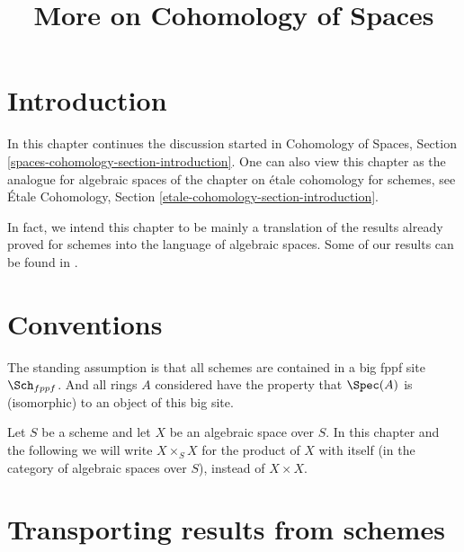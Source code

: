 

%


\title{More on Cohomology of Spaces}

\maketitle

\label{section-phantom}

\tableofcontents




\section{Introduction}
\label{section-introduction}

\noindent
In this chapter continues the discussion started in
Cohomology of Spaces, Section \ref{spaces-cohomology-section-introduction}.
One can also view this chapter as the analogue for algebraic spaces
of the chapter on \'etale cohomology for schemes, see
\'Etale Cohomology, Section \ref{etale-cohomology-section-introduction}.

\medskip\noindent
In fact, we intend this chapter to be mainly a translation of the
results already proved for schemes into the language of algebraic
spaces. Some of our results can be found in \cite{Kn}.





\section{Conventions}
\label{section-conventions}

\noindent
The standing assumption is that all schemes are contained in
a big fppf site $\Sch_{fppf}$. And all rings $A$ considered
have the property that $\Spec(A)$ is (isomorphic) to an
object of this big site.

\medskip\noindent
Let $S$ be a scheme and let $X$ be an algebraic space over $S$.
In this chapter and the following we will write $X \times_S X$
for the product of $X$ with itself (in the category of algebraic
spaces over $S$), instead of $X \times X$.







\section{Transporting results from schemes}
\label{section-api}

